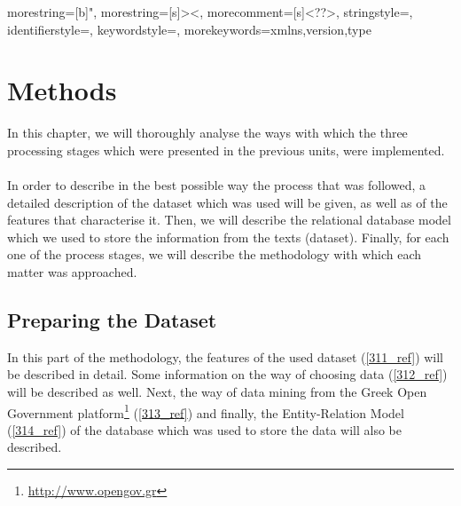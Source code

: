 

{
  morestring=[b]",
  morestring=[s]{>}{<},
  morecomment=[s]{<?}{?>},
  stringstyle=\color{black},
  identifierstyle=\color{darkblue},
  keywordstyle=\color{cyan},
  morekeywords={xmlns,version,type}%
}


\chapter{Methods}
In this chapter, we will thoroughly analyse the ways with which the three processing stages which were presented in the previous units, were implemented.\\
\\
In order to describe in the best possible way the process that was followed, a detailed description of the dataset which was used will be given, as well as of the features that characterise it. Then, we will describe the relational database model which we used to store the information from the texts (dataset). Finally, for each one of the process stages, we will describe the methodology with which each matter was approached.

\section{Preparing the Dataset}\label{31_ref}
In this part of the methodology, the features of the used dataset (\ref{311_ref}) will be described in detail. Some information on the way of choosing data (\ref{312_ref}) will be described as well. Next, the way of data mining from the Greek Open Government platform\footnote{\url{http://www.opengov.gr}} (\ref{313_ref}) and finally, the Entity-Relation Model (\ref{314_ref}) of the database which was used to store the data will also be described.

